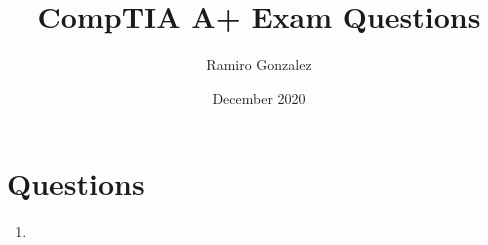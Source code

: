 \documentclass{article}
\title{CompTIA A+ Exam Questions}
\author{Ramiro Gonzalez}
\date{December 2020}
\begin{document}
\maketitle
\section{Questions} 
\begin{enumerate}
    \item 
\end{enumerate}
\end{document}
